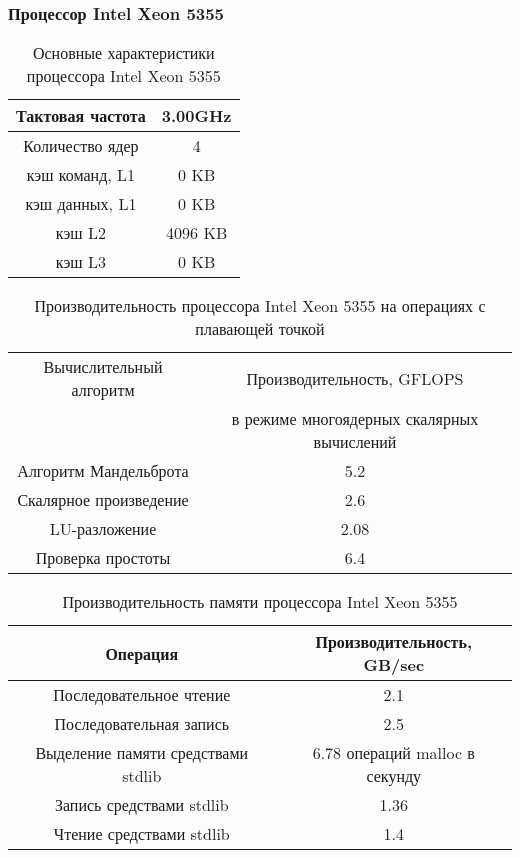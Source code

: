 \subsubsection{Процессор Intel Xeon 5355}

\begin{table}[ht]
	\begin{center}
		\caption{Основные характеристики процессора Intel Xeon  5355}
		\begin{tabular}{|c|c|}
			\hline	
			Тактовая частота & 3.00GHz   \\ \hline
			Количество ядер & 4 	     \\ \hline
			кэш команд, L1 &  0 KB      \\ \hline
			кэш данных, L1 &  0 KB       \\ \hline
			кэш L2         &  4096 KB      \\ \hline
			кэш L3         &  0 KB        \\ \hline
		\end{tabular}
	\end{center} 	
\end{table} 	

\begin{table}[ht]
	\begin{center}
		\caption{Производительность процессора Intel Xeon  5355 на операциях с плавающей точкой}
		\begin{tabular}{|c|c|}
			\hline	
			Вычислительный алгоритм &  Производительность, GFLOPS \\ 
			& в режиме многоядерных скалярных вычислений \\ \hline
			Алгоритм Мандельброта  &  5.2 	\\ \hline
			Скалярное произведение &  2.6   \\ \hline
			LU-разложение          &  2.08   \\ \hline
			Проверка простоты      &  6.4  \\ \hline 
			
			
		\end{tabular}
	\end{center} 	
\end{table} 	

\begin{table}[ht]
	\begin{center}
		\caption{Производительность памяти процессора Intel Xeon 5355}
		\begin{tabular}{|c|c|}
			\hline	
			Операция  &  Производительность, GB/sec \\ \hline
			Последовательное чтение &  2.1 	\\  \hline
			Последовательная запись &  2.5   \\  \hline
			Выделение памяти средствами stdlib &  6.78 операций malloc в секунду  \\  \hline
			Запись средствами stdlib  & 1.36  \\ \hline
			Чтение средствами stdlib  & 1.4 \\ \hline 
		\end{tabular}
	\end{center} 	
\end{table} 	


